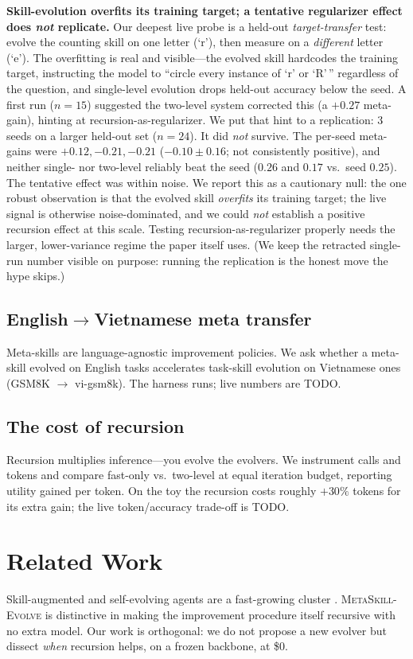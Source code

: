 \documentclass[11pt]{article}
\newcommand{\metaskill}{\textsc{MetaSkill-Evolve}}
\begin{document}
\textbf{Skill-evolution overfits its training target; a tentative regularizer effect
does \emph{not} replicate.} Our deepest live probe is a held-out
\emph{target-transfer} test: evolve the counting skill on one letter (`r'), then
measure on a \emph{different} letter (`e'). The overfitting is real and visible---the
evolved skill hardcodes the training target, instructing the model to ``circle every
instance of `r' or `R'\,'' regardless of the question, and single-level evolution
drops held-out accuracy below the seed. A first run ($n{=}15$) suggested the two-level
system corrected this (a $+0.27$ meta-gain), hinting at recursion-as-regularizer. We
put that hint to a replication: 3 seeds on a larger held-out set ($n{=}24$). It did
\emph{not} survive. The per-seed meta-gains were $+0.12, -0.21, -0.21$
($-0.10 \pm 0.16$; not consistently positive), and neither single- nor two-level
reliably beat the seed ($0.26$ and $0.17$ vs.\ seed $0.25$). The tentative effect was
within noise. We report this as a cautionary null: the one robust observation is that
the evolved skill \emph{overfits} its training target; the live signal is otherwise
noise-dominated, and we could \emph{not} establish a positive recursion effect at this
scale. Testing recursion-as-regularizer properly needs the larger, lower-variance
regime the paper itself uses. (We keep the retracted single-run number visible on
purpose: running the replication is the honest move the hype skips.)

\subsection{English$\rightarrow$Vietnamese meta transfer}\label{sec:transfer}
Meta-skills are language-agnostic improvement policies. We ask whether a meta-skill
evolved on English tasks accelerates task-skill evolution on Vietnamese ones (GSM8K
$\rightarrow$ vi-gsm8k). The harness runs; live numbers are \textsc{TODO}.

\subsection{The cost of recursion}\label{sec:cost}
Recursion multiplies inference---you evolve the evolvers. We instrument calls and
tokens and compare fast-only vs.\ two-level at equal iteration budget, reporting
utility gained per token. On the toy the recursion costs roughly $+30\%$ tokens
for its extra gain; the live token/accuracy trade-off is \textsc{TODO}.

\section{Related Work}
Skill-augmented and self-evolving agents are a fast-growing cluster
\citep{skillrl2026,evolvingrl2026}. \metaskill{} is distinctive in making the
improvement procedure itself recursive with no extra model. Our work is orthogonal:
we do not propose a new evolver but dissect \emph{when} recursion helps, on a
frozen backbone, at \$0.
\end{document}
